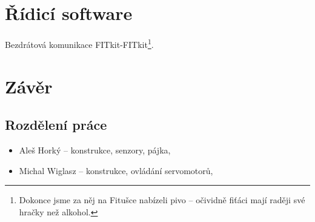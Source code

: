 
\section{Řídicí software}
Bezdrátová komunikace FITkit-FITkit\footnote{Dokonce jsme za něj na Fitušce nabízeli pivo -- očividně fiťáci mají raději své hračky než alkohol.}.

\section{Závěr}

\subsection{Rozdělení práce}

\begin{itemize}
\item Aleš Horký -- konstrukce, senzory, pájka,
\item Michal Wiglasz -- konstrukce, ovládání servomotorů,
\end{itemize}










